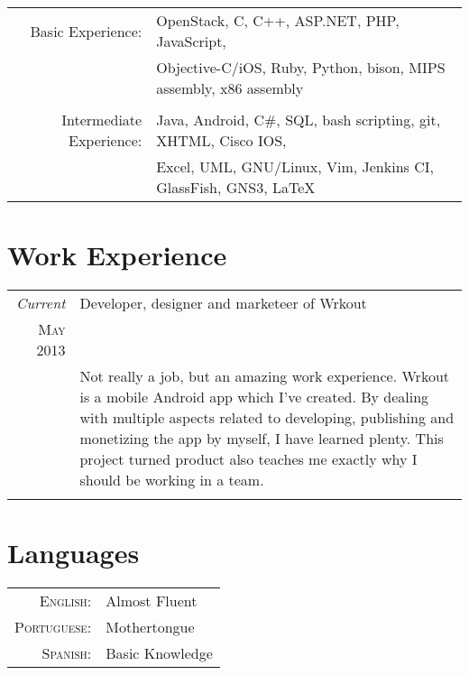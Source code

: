 \documentclass[a4paper,10pt]{article} %
\begin{document}
\begin{tabular}{rl}
Basic Experience: & OpenStack, C, C++, ASP.NET, PHP, JavaScript,\\
& Objective-C/iOS, Ruby, Python, bison, MIPS assembly, x86 assembly\\
& \\

Intermediate Experience: & Java, Android, C\#, SQL, bash scripting, git, XHTML, Cisco IOS,\\
& Excel, UML, GNU/Linux, Vim, Jenkins CI, GlassFish, GNS3, {\LaTeX}\\
\end{tabular}


\section{Work Experience}

\begin{tabular}{r|p{11cm}}
	\emph{Current} & Developer, designer and marketeer of Wrkout \\
	\textsc{May 2013} & \\ 
	& \footnotesize{Not really a job, but an amazing work experience. Wrkout is a mobile Android app which I've created. By dealing with multiple aspects related to developing, publishing and monetizing the app by myself, I have learned plenty. This project turned product also teaches me exactly why I should be working in a team.}\\
	\multicolumn{2}{c}{} \\
	
\end{tabular}


\section{Languages}

\begin{tabular}{rl}
	\textsc{English:} & Almost Fluent\\
	
	\textsc{Portuguese:} & Mothertongue\\
	
	\textsc{Spanish:} & Basic Knowledge\\
\end{tabular}
\end{document}
